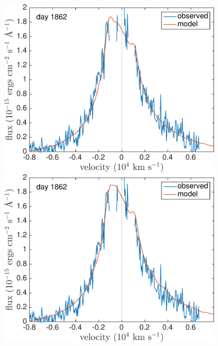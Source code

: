 \begin{figure}
\centering
\includegraphics[trim =0 25 0 -20,clip=true,scale=0.4]{chapters/chapter5/images/clump_1/best_fit/d1862Ha.pdf}
\includegraphics[trim =25 25 0 -20,clip=true,scale=0.4]{chapters/chapter5/images/clump_1/maximum/d1862Ha.pdf}


\end{figure}
